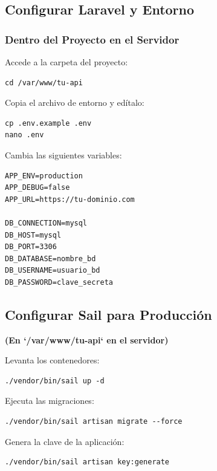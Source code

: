 \documentclass[11pt]{article}
\begin{document}
\subsection{Configurar Laravel y Entorno}
\label{sec:org3145d40}

\subsubsection*{Dentro del Proyecto en el Servidor}
\label{sec:orge6c8b9d}
Accede a la carpeta del proyecto:

\begin{verbatim}
cd /var/www/tu-api
\end{verbatim}

Copia el archivo de entorno y edítalo:

\begin{verbatim}
cp .env.example .env
nano .env
\end{verbatim}

Cambia las siguientes variables:

\begin{verbatim}
APP_ENV=production
APP_DEBUG=false
APP_URL=https://tu-dominio.com

DB_CONNECTION=mysql
DB_HOST=mysql
DB_PORT=3306
DB_DATABASE=nombre_bd
DB_USERNAME=usuario_bd
DB_PASSWORD=clave_secreta
\end{verbatim}

\subsection{Configurar Sail para Producción}
\label{sec:orge8ef64e}

\textbf{\textbf{(En `/var/www/tu-api` en el servidor)}}

Levanta los contenedores:

\begin{verbatim}
./vendor/bin/sail up -d
\end{verbatim}

Ejecuta las migraciones:

\begin{verbatim}
./vendor/bin/sail artisan migrate --force
\end{verbatim}

Genera la clave de la aplicación:

\begin{verbatim}
./vendor/bin/sail artisan key:generate
\end{verbatim}
\end{document}
